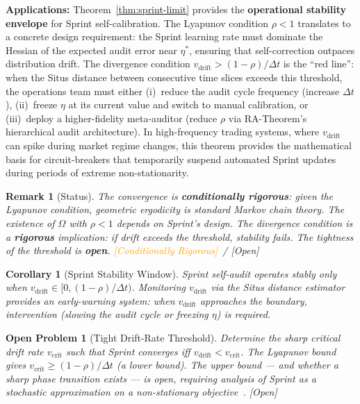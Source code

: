 \documentclass[12pt,a4paper]{article}
\newtheorem{corollary}[theorem]{Corollary}
\newtheorem{remark}[theorem]{Remark}
\newtheorem{openproblem}[theorem]{Open Problem}
\newcommand{\conditionallyrigorous}{\textcolor{orange}{\small\textsf{[Conditionally Rigorous]}}}
\newcommand{\openquest}{\textcolor{red!70!black}{\small\textsf{[Open]}}}
\begin{document}
\medskip\noindent
\textbf{Applications:}
Theorem~\ref{thm:sprint-limit} provides the \textbf{operational stability
envelope} for Sprint self-calibration.  The Lyapunov condition
$\rho<1$ translates to a concrete design requirement: the Sprint learning
rate must dominate the Hessian of the expected audit error near $\eta^*$,
ensuring that self-correction outpaces distribution drift.  The divergence
condition $v_{\mathrm{drift}}>(1-\rho)/\Delta t$ is the ``red line'': when
the Situs distance between consecutive time slices exceeds this threshold, the
operations team must either (i)~reduce the audit cycle frequency (increase
$\Delta t$), (ii)~freeze $\eta$ at its current value and switch to manual
calibration, or (iii)~deploy a higher-fidelity meta-auditor (reduce $\rho$ via
RA-Theorem's hierarchical audit architecture).  In high-frequency trading
systems, where $v_{\mathrm{drift}}$ can spike during market regime changes,
this theorem provides the mathematical basis for circuit-breakers that
temporarily suspend automated Sprint updates during periods of extreme
non-stationarity.

\begin{remark}[Status]
The convergence is \textbf{conditionally rigorous}: given the Lyapunov
condition, geometric ergodicity is standard Markov chain theory.  The
existence of $\Omega$ with $\rho < 1$ depends on Sprint's design.  The
divergence condition is a \textbf{rigorous} implication: if drift exceeds
the threshold, stability fails.  The \emph{tightness} of the threshold
is \textbf{open}.  \conditionallyrigorous~/ \openquest
\end{remark}

\begin{corollary}[Sprint Stability Window]
\label{cor:stability}
Sprint self-audit operates stably only when
$v_{\mathrm{drift}} \in [0, (1-\rho)/\Delta t)$.  Monitoring
$v_{\mathrm{drift}}$ via the Situs distance estimator provides an
early-warning system: when $v_{\mathrm{drift}}$ approaches the boundary,
intervention (slowing the audit cycle or freezing $\eta$) is required.
\end{corollary}

\begin{openproblem}[Tight Drift-Rate Threshold]
\label{prob:tight-threshold}
Determine the \emph{sharp} critical drift rate $v_{\mathrm{crit}}$ such
that Sprint converges iff $v_{\mathrm{drift}} < v_{\mathrm{crit}}$.
The Lyapunov bound gives $v_{\mathrm{crit}} \geq (1-\rho)/\Delta t$
(a lower bound).  The upper bound --- and whether a sharp phase transition
exists --- is open, requiring analysis of Sprint as a stochastic
approximation on a non-stationary objective~\citep{benveniste1990adaptive}.
\openquest
\end{openproblem}
\end{document}
